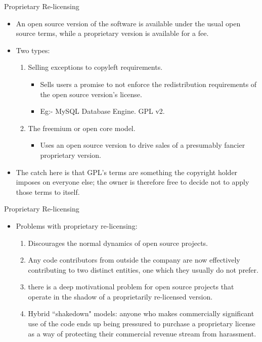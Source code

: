 \documentclass{beamer}
\begin{document}
\begin{frame}{Proprietary Re-licensing}
\begin{itemize}
	\item An open source version of the software is available under the usual open source terms, while a proprietary version is available for a fee.
	\item Two types:
	\begin{enumerate}
		\item Selling exceptions to copyleft requirements. 
		\begin{itemize}
			\item Sells users a promise to not enforce the redistribution requirements of the open source version's license.
			\item Eg:- MySQL Database Engine. GPL v2. 
		\end{itemize}
		\item The freemium or open core model. 
		\begin{itemize}
			\item Uses an open source version to drive sales of a presumably fancier proprietary version. 
		\end{itemize}
	\end{enumerate}
	\item The catch here is that GPL's terms are something the copyright holder imposes on everyone else; the owner is therefore free to decide not to apply those terms to itself.
\end{itemize}
\end{frame}

\begin{frame}{Proprietary Re-licensing}
\begin{itemize}
	\item Problems with proprietary re-licensing:
	\begin{enumerate}
		\item Discourages the normal dynamics of open source projects. 
		\item Any code contributors from outside the company are now effectively contributing to two distinct entities, one which they usually do not prefer. 
		\item there is a deep motivational problem for open source projects that operate in the shadow of a proprietarily re-licensed version. 
		\item Hybrid ``shakedown" models: anyone who makes commercially significant use of the code ends up being pressured to purchase a proprietary license as a way of protecting their commercial revenue stream from harassment.
	\end{enumerate}
\end{itemize}
\end{frame}
	
\end{document}
